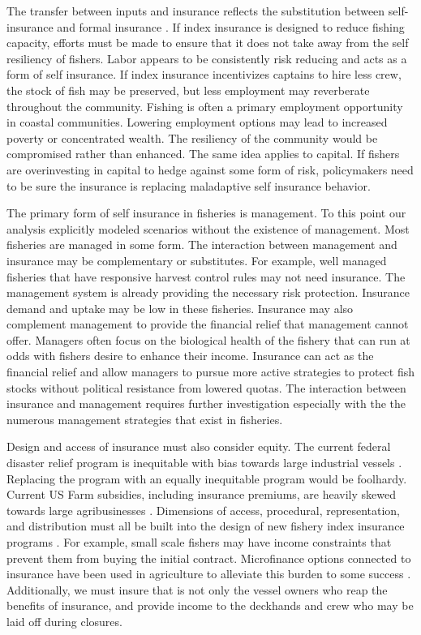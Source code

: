 \documentclass[
  super,
  preprint,
  3p]{elsarticle}
\theoremstyle{plain}
\theoremstyle{plain}
\theoremstyle{remark}
\begin{document}
The transfer between inputs and insurance reflects the substitution
between self-insurance and formal insurance \citep{Quaas2008}. If index
insurance is designed to reduce fishing capacity, efforts must be made
to ensure that it does not take away from the self resiliency of
fishers. Labor appears to be consistently risk reducing and acts as a
form of self insurance. If index insurance incentivizes captains to hire
less crew, the stock of fish may be preserved, but less employment may
reverberate throughout the community. Fishing is often a primary
employment opportunity in coastal communities. Lowering employment
options may lead to increased poverty or concentrated wealth. The
resiliency of the community would be compromised rather than enhanced.
The same idea applies to capital. If fishers are overinvesting in
capital to hedge against some form of risk, policymakers need to be sure
the insurance is replacing maladaptive self insurance behavior.

The primary form of self insurance in fisheries is management. To this
point our analysis explicitly modeled scenarios without the existence of
management. Most fisheries are managed in some form. The interaction
between management and insurance may be complementary or substitutes.
For example, well managed fisheries that have responsive harvest control
rules may not need insurance. The management system is already providing
the necessary risk protection. Insurance demand and uptake may be low in
these fisheries. Insurance may also complement management to provide the
financial relief that management cannot offer. Managers often focus on
the biological health of the fishery that can run at odds with fishers
desire to enhance their income. Insurance can act as the financial
relief and allow managers to pursue more active strategies to protect
fish stocks without political resistance from lowered quotas. The
interaction between insurance and management requires further
investigation especially with the the numerous management strategies
that exist in fisheries.

Design and access of insurance must also consider equity. The current
federal disaster relief program is inequitable with bias towards large
industrial vessels \citep{Jardine2020}. Replacing the program with an
equally inequitable program would be foolhardy. Current US Farm
subsidies, including insurance premiums, are heavily skewed towards
large agribusinesses \citep{White2012}. Dimensions of access,
procedural, representation, and distribution must all be built into the
design of new fishery index insurance programs \citep{Fisher2019}. For
example, small scale fishers may have income constraints that prevent
them from buying the initial contract. Microfinance options connected to
insurance have been used in agriculture to alleviate this burden to some
success \citep{Dougherty2021}. Additionally, we must insure that is not
only the vessel owners who reap the benefits of insurance, and provide
income to the deckhands and crew who may be laid off during closures.
\end{document}
